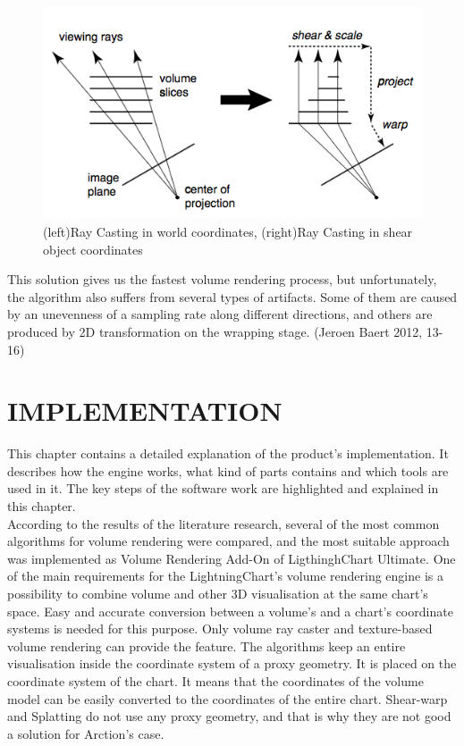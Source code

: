 \documentclass[twoside, english, 11pt]{report}
\begin{document}
\begin{figure}[!h]
\centerline{\includegraphics[scale=0.5]{img/shear-warp}}
\caption{(left)Ray Casting in world coordinates, (right)Ray Casting in shear object coordinates\label{fig:sw}}
\end{figure}

This solution gives us the fastest volume rendering process, but unfortunately, the algorithm also suffers from several types of artifacts. Some of them are caused by an unevenness of a sampling rate along different directions, and others are produced by 2D transformation on the wrapping stage. (Jeroen Baert 2012, 13-16)\\

\chapter{IMPLEMENTATION}
This chapter contains a detailed explanation of the product's implementation. It describes how the engine works, what kind of parts contains and which tools are used in it. The key steps of the software work are highlighted and explained in this chapter.\\

According to the results of the literature research, several of the most common algorithms for volume rendering were compared, and the most suitable approach was implemented as Volume Rendering Add-On of LigthinghChart Ultimate. One of the main requirements for the LightningChart's volume rendering engine is a possibility to combine volume and other 3D visualisation at the same chart's space. Easy and accurate conversion between a volume's and a chart's coordinate systems is needed for this purpose. Only volume ray caster and texture-based volume rendering can provide the feature. The algorithms keep an entire visualisation inside the coordinate system of a proxy geometry. It is placed on the coordinate system of the chart. It means that the coordinates of the volume model can be easily converted to the coordinates of the entire chart. Shear-warp and Splatting do not use any proxy geometry, and that is why they are not good a solution for Arction's case.\\
\end{document}
